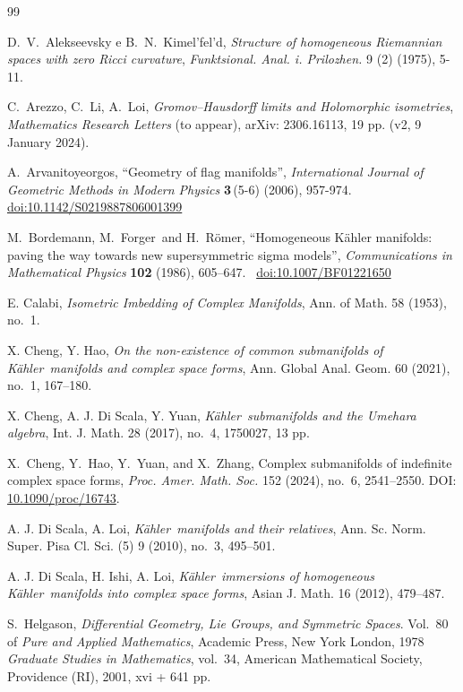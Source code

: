 \documentclass[reqno]{amsart}
\newcommand{\K}{K\"{a}hler}
\begin{document}
\begin{thebibliography}{99}

D.~V.~Alekseevsky e B.~N.~Kimel'fel'd, 
\emph{Structure of homogeneous Riemannian spaces with zero Ricci curvature},  
\textit{Funktsional. Anal. i. Prilozhen.} 9 (2) (1975), 5-11.  


C.~Arezzo, C.~Li, A.~Loi,
\emph{Gromov--Hausdorff limits and Holomorphic isometries},
\textit{Mathematics Research Letters} (to appear), arXiv: 2306.16113, 19 pp. (v2, 9 January 2024).

A.~Arvanitoyeorgos,
``Geometry of flag manifolds'',
\emph{International Journal of Geometric Methods in Modern Physics}
\textbf{3}\,(5-6) (2006), 957-974.\ %
\href{https://doi.org/10.1142/S0219887806001399}{doi:10.1142/S0219887806001399}

M.~Bordemann, M.~Forger\ and H.~R\"{o}mer,
``Homogeneous K\"{a}hler manifolds: paving the way towards new supersymmetric sigma models'',
\emph{Communications in Mathematical Physics}
\textbf{102} (1986), 605--647.\ %
\href{https://doi.org/10.1007/BF01221650}{doi:10.1007/BF01221650}




 E. Calabi,  {\em Isometric Imbedding of Complex Manifolds}, Ann. of Math. 58 (1953), no.~1.

X. Cheng, Y. Hao, \emph{On the non-existence of common submanifolds of \K\ manifolds and complex space forms}, Ann. Global Anal. Geom. 60 (2021), no.~1, 167--180.


X. Cheng, A. J. Di Scala, Y. Yuan,  
\emph{\K\ submanifolds and the Umehara algebra}, 
Int. J. Math. 28 (2017), no.~4, 1750027, 13 pp.

X.~Cheng, Y.~Hao, Y.~Yuan, and X.~Zhang,
Complex submanifolds of indefinite complex space forms,
\emph{Proc. Amer. Math. Soc.} 152 (2024), no.~6, 2541--2550.
\newblock DOI: \href{https://doi.org/10.1090/proc/16743}{10.1090/proc/16743}.


A. J. Di Scala, A. Loi, 
{\em \K\ manifolds and their relatives},
Ann. Sc. Norm. Super. Pisa Cl. Sci. (5) 9 (2010), no.~3, 495--501.

A. J. Di Scala, H. Ishi, A. Loi, \emph{\K\ immersions of homogeneous \K\ manifolds into complex space forms}, Asian J. Math. 16 (2012), 479--487.

S.~Helgason,
\textit{Differential Geometry, Lie Groups, and Symmetric Spaces}.
Vol.~80 of \textit{Pure and Applied Mathematics},
Academic Press, New York London, 1978 \textit{Graduate Studies in Mathematics},
vol.~34, American Mathematical Society, Providence (RI), 2001, xvi + 641 pp.



\end{thebibliography}
\end{document}
